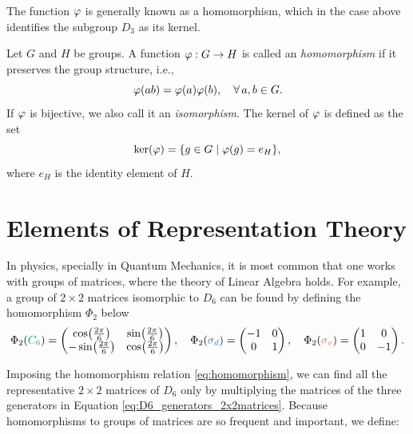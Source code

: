 The function $\varphi$ is generally known as a homomorphism, which in the case above identifies the subgroup $D_3$ as its kernel.

\begin{definition}
Let $G$ and $H$ be groups. A function $\varphi: G \to H$ is called an \textit{homomorphism} if it preserves the group structure, i.e.,
\begin{equation} \label{eq:homomorphism}
\varphi(a b) = \varphi(a) \varphi(b), \quad \forall \, a,b \in G.
\end{equation}
If $\varphi$ is bijective, we also call it an \textit{isomorphism}. The kernel of $\varphi$ is defined as the set
$$
\ker(\varphi) = \qty{g \in G \mid \varphi(g) = e_H},
$$
where $e_H$ is the identity element of $H$.
\end{definition}

\pagebreak

\section{Elements of Representation Theory}

In physics, specially in Quantum Mechanics, it is most common that one works with groups of matrices, where the theory of Linear Algebra holds. For example, a group of $2\times 2$ matrices isomorphic to $D_6$ can be found by defining the homomorphism $\Phi_2$ below
\begin{equation} \label{eq:D6_generators_2x2matrices}
\Phi_2(\Cs) =
\begin{pmatrix}
\cos(\frac{2\pi}{6}) & \sin(\frac{2\pi}{6}) \\
-\sin(\frac{2\pi}{6}) & \cos(\frac{2\pi}{6})
\end{pmatrix},
\quad
\Phi_2(\sd) =
\begin{pmatrix}
-1 & 0 \\
0 & 1
\end{pmatrix},
\quad
\Phi_2(\sv) =
\begin{pmatrix}
1 & 0 \\
0 & -1
\end{pmatrix}.
\end{equation}

Imposing the homomorphism relation \ref{eq:homomorphism}, we can find all the representative $2\times 2$ matrices of $D_6$ only by multiplying the matrices of the three generators in Equation \ref{eq:D6_generators_2x2matrices}. Because homomorphisms to groups of matrices are so frequent and important, we define:

